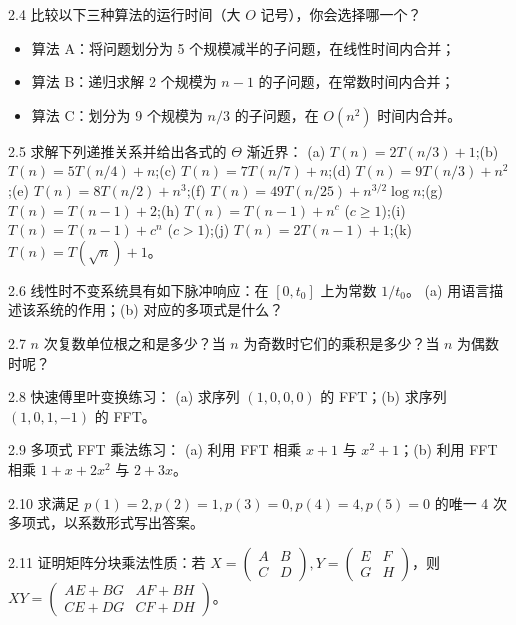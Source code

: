 \begin{exercise}{2.4}
比较以下三种算法的运行时间（大 $O$ 记号），你会选择哪一个？
\begin{itemize}
    \item 算法 A：将问题划分为 5 个规模减半的子问题，在线性时间内合并；
    \item 算法 B：递归求解 2 个规模为 $n-1$ 的子问题，在常数时间内合并；
    \item 算法 C：划分为 9 个规模为 $n/3$ 的子问题，在 $O(n^2)$ 时间内合并。
\end{itemize}
\end{exercise}

\begin{exercise}{2.5}
求解下列递推关系并给出各式的 $\Theta$ 渐近界：
(a) $T(n) = 2T(n/3) + 1$;\quad (b) $T(n) = 5T(n/4) + n$;\quad (c) $T(n) = 7T(n/7) + n$;\quad (d) $T(n) = 9T(n/3) + n^2$;\quad (e) $T(n) = 8T(n/2) + n^3$;\quad (f) $T(n) = 49T(n/25) + n^{3/2} \log n$;\quad (g) $T(n) = T(n - 1) + 2$;\quad (h) $T(n) = T(n - 1) + n^c$ ($c \ge 1$);\quad (i) $T(n) = T(n - 1) + c^n$ ($c > 1$);\quad (j) $T(n) = 2T(n - 1) + 1$;\quad (k) $T(n) = T(\sqrt{n}) + 1$。
\end{exercise}

\begin{exercise}{2.6}
线性时不变系统具有如下脉冲响应：在 $[0, t_0]$ 上为常数 $1/t_0$。
(a) 用语言描述该系统的作用；(b) 对应的多项式是什么？
\end{exercise}

\begin{exercise}{2.7}
$n$ 次复数单位根之和是多少？当 $n$ 为奇数时它们的乘积是多少？当 $n$ 为偶数时呢？
\end{exercise}

\begin{exercise}{2.8}
快速傅里叶变换练习：
(a) 求序列 $(1, 0, 0, 0)$ 的 FFT；(b) 求序列 $(1, 0, 1, -1)$ 的 FFT。
\end{exercise}

\begin{exercise}{2.9}
多项式 FFT 乘法练习：
(a) 利用 FFT 相乘 $x + 1$ 与 $x^2 + 1$；(b) 利用 FFT 相乘 $1 + x + 2x^2$ 与 $2 + 3x$。
\end{exercise}

\begin{exercise}{2.10}
求满足 $p(1) = 2, p(2) = 1, p(3) = 0, p(4) = 4, p(5) = 0$ 的唯一 4 次多项式，以系数形式写出答案。
\end{exercise}

\begin{exercise}{2.11}
证明矩阵分块乘法性质：若 $X = \begin{pmatrix} A & B \\ C & D \end{pmatrix}, Y = \begin{pmatrix} E & F \\ G & H \end{pmatrix}$，则 $XY = \begin{pmatrix} AE + BG & AF + BH \\ CE + DG & CF + DH \end{pmatrix}$。
\end{exercise}

